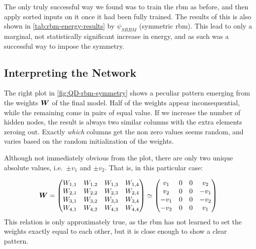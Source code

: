 \documentclass[Thesis.tex]{subfiles}
\begin{document}
The only truly successful way we found was to train the \gls{rbm} as before, and then
apply sorted inputs on it once it had been fully trained. The results of this is
also shown in \cref{tab:rbm-energy-results} by $\psi_{SRBM}$ (symmetric \gls{rbm}). This lead to only a
marginal, not statistically significant increase in energy, and as such was a
successful way to impose the symmetry.

\subsection{Interpreting the Network}

The right plot in \cref{fig:QD-rbm-symmetry} shows a peculiar pattern emerging
from the weights $\bm{W}$ of the final model. Half of the weights appear
inconsequential, while the remaining come in pairs of equal value. If we
increase the number of hidden nodes, the result is always two similar columns with the extra elements
zeroing out. Exactly \emph{which} columns get the non zero values seems random,
and varies based on the random initialization of the weights.

Although not immediately obvious from the plot, there are only two unique
absolute values, i.e.\ $\pm v_1$ and $\pm v_2$. That is, in this particular
case:

\begin{align}
  \mat W = \mqty(
                    W_{1,1} & W_{1,2} & W_{1,3} & W_{1,4}\\
                    W_{2,1} & W_{2,2} & W_{2,3} & W_{2,4}\\
                    W_{3,1} & W_{3,2} & W_{3,3} & W_{3,4}\\
                    W_{4,1} & W_{4,2} & W_{4,3} & W_{4,4}
                )
                                                  \simeq \mqty(
                                                   v_1 & 0 & 0 &  v_2\\
                                                   v_2 & 0 & 0 & -v_1\\
                                                  -v_1 & 0 & 0 & -v_2\\
                                                  -v_2 & 0 & 0 &  v_1
                                                  )
\end{align}
This relation is only approximately true, as the \gls{rbm} has not learned to set the
weights exactly equal to each other, but it is close enough to show a clear
pattern.
\end{document}
